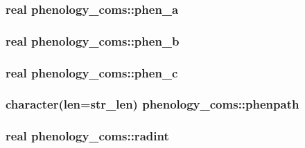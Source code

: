 \subsubsection[{phen\+\_\+a}]{\setlength{\rightskip}{0pt plus 5cm}real phenology\+\_\+coms\+::phen\+\_\+a}\label{namespacephenology__coms_a68b65a488b28872a9aca9fed46ba4eaf}
\hypertarget{namespacephenology__coms_add9263a2bb7374fee2ecef8d4ec4f53c}{}
\subsubsection[{phen\+\_\+b}]{\setlength{\rightskip}{0pt plus 5cm}real phenology\+\_\+coms\+::phen\+\_\+b}\label{namespacephenology__coms_add9263a2bb7374fee2ecef8d4ec4f53c}
\hypertarget{namespacephenology__coms_a8aee741f7b4cfd7e550ca881a5b4e7fc}{}
\subsubsection[{phen\+\_\+c}]{\setlength{\rightskip}{0pt plus 5cm}real phenology\+\_\+coms\+::phen\+\_\+c}\label{namespacephenology__coms_a8aee741f7b4cfd7e550ca881a5b4e7fc}
\hypertarget{namespacephenology__coms_a533c334911241cc02bef0ae05f5e1adc}{}
\subsubsection[{phenpath}]{\setlength{\rightskip}{0pt plus 5cm}character(len=str\+\_\+len) phenology\+\_\+coms\+::phenpath}\label{namespacephenology__coms_a533c334911241cc02bef0ae05f5e1adc}
\hypertarget{namespacephenology__coms_aa7a0cd40eeb581ef9fd19cb3d4307482}{}
\subsubsection[{radint}]{\setlength{\rightskip}{0pt plus 5cm}real phenology\+\_\+coms\+::radint}\label{namespacephenology__coms_aa7a0cd40eeb581ef9fd19cb3d4307482}
\hypertarget{namespacephenology__coms_a90c70299bd2648e86392527bef4e132b}{}
